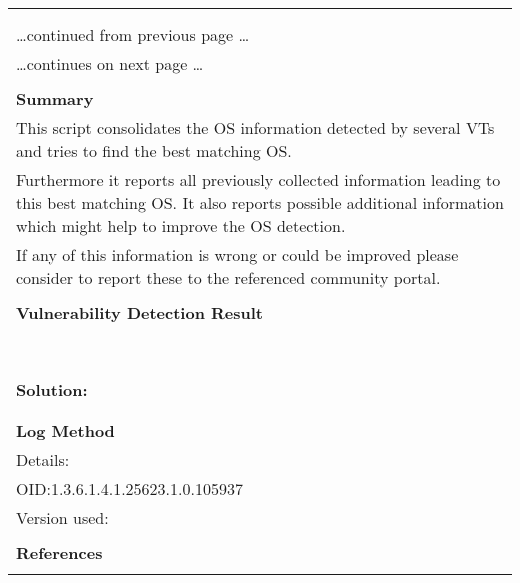 \documentclass{article}
\begin{document}
\begin{longtable}{|p{}|}
\hline
\rowcolor{gvm_log}{\color{white}{Log (CVSS: 0.0) }}\\
\rowcolor{gvm_log}{\color{white}{NVT: OS Detection Consolidation and Reporting}}\\
\hline
\endfirsthead
\hfill\ldots continued from previous page \ldots \\
\hline
\endhead
\hline
\ldots continues on next page \ldots \\
\endfoot
\hline
\endlastfoot
\\
\textbf{Summary}\\
This script consolidates the OS information detected by several
  VTs and tries to find the best matching OS.\\
  Furthermore it reports all previously collected information leading to this best matching OS. It
  also reports possible additional information which might help to improve the OS detection.\\
  If any of this information is wrong or could be improved please consider to report these to the
  referenced community portal.\\

        \hline
        \\
\textbf{Vulnerability Detection Result}\\
\rowcolor{white}{\verb=Best matching OS:=}\\
\rowcolor{white}{\verb=OS:           HP JetDirect=}\\
\rowcolor{white}{\verb=CPE:          cpe:/h:hp:jetdirect=}\\
\rowcolor{white}{\verb=Found by NVT: 1.3.6.1.4.1.25623.1.0.102002 (Operating System (OS) Detection (ICM=}\\
\rowcolor{white}{$\hookrightarrow$\verb=P))=}\\
\rowcolor{white}{\verb=Concluded from ICMP based OS fingerprint=}\\
\rowcolor{white}{\verb=Setting key "Host/runs_unixoide" based on this information=}\\

          \hline
          \\
\textbf{Solution:}\\
\\


        \hline
        \\
\textbf{Log Method}\\
Details:
\rowcolor{white}{\verb=OS Detection Consolidation and Reporting=}\\
OID:1.3.6.1.4.1.25623.1.0.105937\\
Version used:
\rowcolor{white}{\verb=2022-04-05T09:27:51Z=}\\

      \hline
      \\
\textbf{References}\\
\rowcolor{white}{\verb=url: https://community.greenbone.net/c/vulnerability-tests=}\\
\end{longtable}
\end{document}
